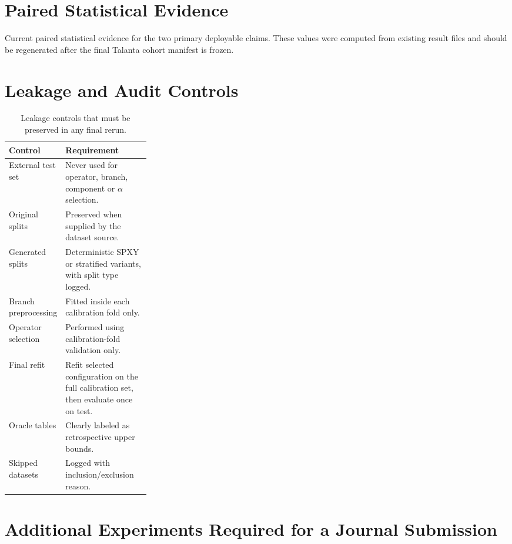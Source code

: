 \documentclass[11pt,a4paper]{article}
\begin{document}
\section{Paired Statistical Evidence}

\begin{table}[h]
\centering
\caption{Current paired statistical evidence for the two primary deployable
claims.  These values were computed from existing result files and should be
regenerated after the final Talanta cohort manifest is frozen.}
\small

\end{table}

\section{Leakage and Audit Controls}

\begin{table}[h]
\centering
\caption{Leakage controls that must be preserved in any final rerun.}
\small
\begin{tabularx}{\linewidth}{p{0.28\linewidth}X}
\toprule
Control & Requirement \\
\midrule
External test set & Never used for operator, branch, component or $\alpha$ selection.\\
Original splits & Preserved when supplied by the dataset source.\\
Generated splits & Deterministic SPXY or stratified variants, with split type logged.\\
Branch preprocessing & Fitted inside each calibration fold only.\\
Operator selection & Performed using calibration-fold validation only.\\
Final refit & Refit selected configuration on the full calibration set, then evaluate once on test.\\
Oracle tables & Clearly labeled as retrospective upper bounds.\\
Skipped datasets & Logged with inclusion/exclusion reason.\\
\bottomrule
\end{tabularx}
\end{table}

\section{Additional Experiments Required for a Journal Submission}
\end{document}
